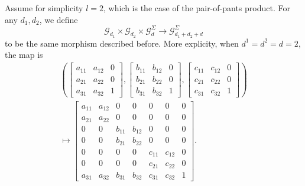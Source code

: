 \documentclass[reqno, 10pt]{amsart}
\numberwithin{equation}{section}
\numberwithin{equation}{section}
\theoremstyle{definition}
\theoremstyle{remark}
\newcommand{\beqn}{\begin{equation*}}
\newcommand{\eeqn}{\end{equation*}}
\newcommand{\mc}{\mathcal}
\begin{document}
Assume for simplicity $l = 2$, which is the case of the pair-of-pants product.  For any $d_1, d_2$, we define
\beqn
{\mc G}_{d_1} \times {\mc G}_{d_2} \times {\mc G}_d^\Sigma  \to   {\mc G}_{d_1 + d_2 + d}^\Sigma
\eeqn
to be the same morphism described before. More explicity, when $d^1 = d^2 = d = 2$, the map is
\begin{multline*}
\left( \left[ \begin{array}{ccc} a_{11} & a_{12} & 0 \\ a_{21} & a_{22} & 0 \\
a_{31} & a_{32} & 1  \end{array} \right], \left[ \begin{array}{ccc} b_{11} & b_{12} & 0 \\  b_{21} & b_{22} & 0 \\
b_{31} & b_{32} & 1  \end{array} \right], \left[ \begin{array}{ccc} c_{11} & c_{12} & 0 \\ c_{21} & c_{22} & 0 \\ c_{31} & c_{32} & 1  \end{array} \right] \right) \\
\mapsto \left[ \begin{array}{ccccccc} a_{11} & a_{12} & 0 & 0 & 0 & 0 & 0 \\
a_{21} & a_{22} & 0 & 0 & 0 & 0 & 0 \\
0 & 0 & b_{11} & b_{12} & 0 & 0 & 0 \\
0 & 0 & b_{21} & b_{22} & 0 & 0 & 0 \\
0 & 0 & 0 & 0 & c_{11} & c_{12} & 0 \\
0 & 0 & 0 & 0 & c_{21} & c_{22} & 0 \\
a_{31} & a_{32} & b_{31} & b_{32} & c_{31} & c_{32} & 1 
\end{array} \right].
\end{multline*}
\end{document}
